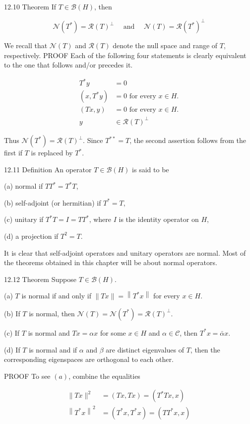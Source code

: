 \documentclass[10pt]{article}
\begin{document}
12.10 Theorem If $T \in \mathscr{B}(H)$, then

$$
\mathscr{N}\left(T^{*}\right)=\mathscr{R}(T)^{\perp} \quad \text { and } \quad \mathscr{N}(T)=\mathscr{R}\left(T^{*}\right)^{\perp}
$$

We recall that $\mathscr{N}(T)$ and $\mathscr{R}(T)$ denote the null space and range of $T$, respectively. PROOF Each of the following four statements is clearly equivalent to the one that follows and/or precedes it.

$$
\begin{aligned}
T^{*} y & =0 \\
\left(x, T^{*} y\right) & =0 \text { for every } x \in H . \\
(T x, y) & =0 \text { for every } x \in H . \\
y & \in \mathscr{R}(T)^{\perp}
\end{aligned}
$$

Thus $\mathscr{N}\left(T^{*}\right)=\mathscr{R}(T)^{\perp}$. Since $T^{* *}=T$, the second assertion follows from the first if $T$ is replaced by $T^{*}$.

12.11 Definition An operator $T \in \mathscr{B}(H)$ is said to be

(a) normal if $T T^{*}=T^{*} T$,

(b) self-adjoint (or hermitian) if $T^{*}=T$,

(c) unitary if $T^{*} T=I=T T^{*}$, where $I$ is the identity operator on $H$,

(d) a projection if $T^{2}=T$.

It is clear that self-adjoint operators and unitary operators are normal. Most of the theorems obtained in this chapter will be about normal operators.

12.12 Theorem Suppose $T \in \mathscr{B}(H)$.

(a) $T$ is normal if and only if $\|T x\|=\left\|T^{*} x\right\|$ for every $x \in H$.

(b) If $T$ is normal, then $\mathscr{N}(T)=\mathscr{N}\left(T^{*}\right)=\mathscr{R}(T)^{\perp}$.

(c) If $T$ is normal and $T x=\alpha x$ for some $x \in H$ and $\alpha \in \mathscr{C}$, then $T^{*} x=\bar{\alpha} x$.

(d) If $T$ is normal and if $\alpha$ and $\beta$ are distinct eigenvalues of $T$, then the corresponding eigenspaces are orthogonal to each other.

PROOF To see $(a)$, combine the equalities

$$
\begin{aligned}
\|T x\|^{2} & =(T x, T x)=\left(T^{*} T x, x\right) \\
\left\|T^{*} x\right\|^{2} & =\left(T^{*} x, T^{*} x\right)=\left(T T^{*} x, x\right)
\end{aligned}
$$
\end{document}
